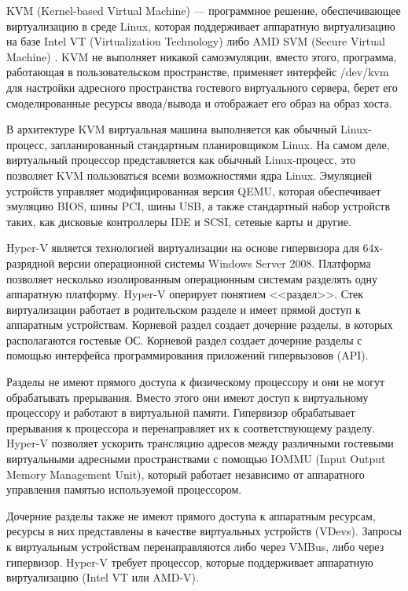 KVM (Kernel-based Virtual Machine) --- программное решение, обеспечивающее виртуализацию в среде Linux, которая поддерживает аппаратную виртуализацию на базе Intel VT (Virtualization Technology) либо AMD SVM (Secure Virtual Machine) \cite{kvm-ibm}.
KVM не выполняет никакой самоэмуляции, вместо этого, программа, работающая в пользовательском пространстве, применяет интерфейс /dev/kvm для настройки адресного пространства гостевого виртуального сервера, берет его смоделированные ресурсы ввода/вывода и отображает его образ на образ хоста.

В архитектуре KVM виртуальная машина выполняется как обычный Linux-процесс, запланированный стандартным планировщиком Linux.
На самом деле, виртуальный процессор представляется как обычный Linux-процесс, это позволяет KVM пользоваться всеми возможностями ядра Linux.
Эмуляцией устройств управляет модифицированная версия QEMU, которая обеспечивает эмуляцию BIOS, шины PCI, шины USB, а также стандартный набор устройств таких, как дисковые контроллеры IDE и SCSI, сетевые карты и другие.

Hyper-V является технологией виртуализации на основе гипервизора для 64х-разрядной версии операционной системы Windows Server 2008.
Платформа позволяет несколько изолированным операционным системам разделять одну аппаратную платформу.
Hyper-V оперирует понятием <<раздел>>.
Стек виртуализации работает в родительском разделе и имеет прямой доступ к аппаратным устройствам.
Корневой раздел создает дочерние разделы, в которых располагаются гостевые ОС.
Корневой раздел создает дочерние разделы с помощью интерфейса программирования приложений гипервызовов (API).

Разделы не имеют прямого доступа к физическому процессору и они не могут обрабатывать прерывания.
Вместо этого они имеют доступ к виртуальному процессору и работают в виртуальной памяти.
Гипервизор обрабатывает прерывания к процессора и перенаправляет их к соответствующему разделу.
Hyper-V позволяет ускорить трансляцию адресов между различными гостевыми виртуальными адресными пространствами с помощью IOMMU (Input Output Memory Management Unit), который работает независимо от аппаратного управления памятью используемой процессором.

Дочерние разделы также не имеют прямого доступа к аппаратным ресурсам, ресурсы в них представлены в качестве виртуальных устройств (VDevs).
Запросы к виртуальным устройствам перенаправляются либо через VMBus, либо через гипервизор.
Hyper-V требует процессор, которые поддерживает аппаратную виртуализацию (Intel VT или AMD-V).

